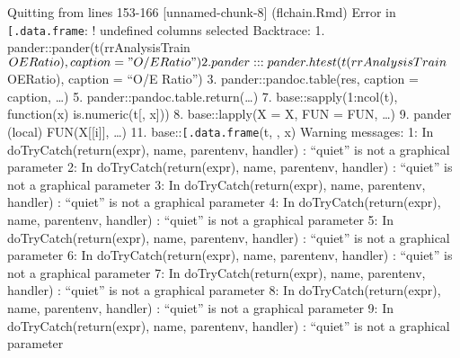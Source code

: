 \documentclass[
]{article}
\newenvironment{Shaded}{\begin{snugshade}}{\end{snugshade}}
\newcommand{\AttributeTok}[1]{\textcolor[rgb]{0.13,0.29,0.53}{#1}}
\newcommand{\FunctionTok}[1]{\textcolor[rgb]{0.13,0.29,0.53}{\textbf{#1}}}
\newcommand{\NormalTok}[1]{#1}
\newcommand{\SpecialCharTok}[1]{\textcolor[rgb]{0.81,0.36,0.00}{\textbf{#1}}}
\newcommand{\StringTok}[1]{\textcolor[rgb]{0.31,0.60,0.02}{#1}}
\begin{document}
Quitting from lines 153-166 {[}unnamed-chunk-8{]} (flchain.Rmd) Error in
\texttt{{[}.data.frame}: ! undefined columns selected Backtrace: 1.
pander::pander(t(rrAnalysisTrain\(OERatio), caption = "O/E Ratio")  2. pander:::pander.htest(t(rrAnalysisTrain\)OERatio),
caption = ``O/E Ratio'') 3. pander::pandoc.table(res, caption = caption,
\ldots) 5. pander::pandoc.table.return(\ldots) 7.
base::sapply(1:ncol(t), function(x) is.numeric(t{[}, x{]})) 8.
base::lapply(X = X, FUN = FUN, \ldots) 9. pander (local)
FUN(X{[}{[}i{]}{]}, \ldots) 11. base::\texttt{{[}.data.frame}(t, , x)
Warning messages: 1: In doTryCatch(return(expr), name, parentenv,
handler) : ``quiet'' is not a graphical parameter 2: In
doTryCatch(return(expr), name, parentenv, handler) : ``quiet'' is not a
graphical parameter 3: In doTryCatch(return(expr), name, parentenv,
handler) : ``quiet'' is not a graphical parameter 4: In
doTryCatch(return(expr), name, parentenv, handler) : ``quiet'' is not a
graphical parameter 5: In doTryCatch(return(expr), name, parentenv,
handler) : ``quiet'' is not a graphical parameter 6: In
doTryCatch(return(expr), name, parentenv, handler) : ``quiet'' is not a
graphical parameter 7: In doTryCatch(return(expr), name, parentenv,
handler) : ``quiet'' is not a graphical parameter 8: In
doTryCatch(return(expr), name, parentenv, handler) : ``quiet'' is not a
graphical parameter 9: In doTryCatch(return(expr), name, parentenv,
handler) : ``quiet'' is not a graphical parameter

\begin{Shaded}
\end{Shaded}
\end{document}
